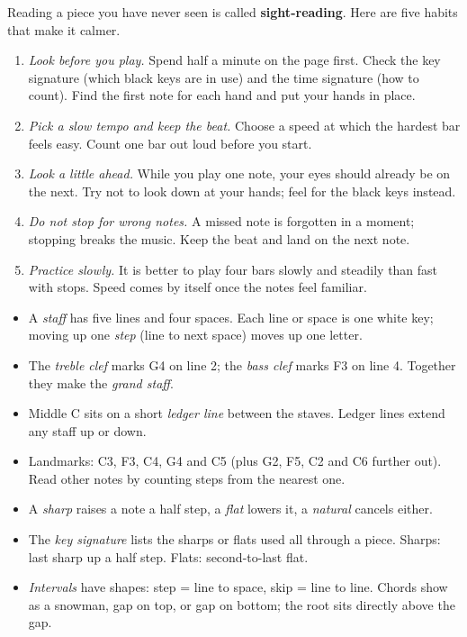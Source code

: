 Reading a piece you have never seen is called \textbf{sight-reading}. Here are five habits that make it calmer.
\begin{enumerate}
  \item \emph{Look before you play.} Spend half a minute on the page first. Check the key signature (which black keys are in use) and the time signature (how to count). Find the first note for each hand and put your hands in place.
  \item \emph{Pick a slow tempo and keep the beat.} Choose a speed at which the hardest bar feels easy. Count one bar out loud before you start.
  \item \emph{Look a little ahead.} While you play one note, your eyes should already be on the next. Try not to look down at your hands; feel for the black keys instead.
  \item \emph{Do not stop for wrong notes.} A missed note is forgotten in a moment; stopping breaks the music. Keep the beat and land on the next note.
  \item \emph{Practice slowly.} It is better to play four bars slowly and steadily than fast with stops. Speed comes by itself once the notes feel familiar.
\end{enumerate}

\begin{summarybox}
\begin{itemize}
  \item A \emph{staff} has five lines and four spaces. Each line or space is one white key; moving up one \emph{step} (line to next space) moves up one letter.
  \item The \emph{treble clef} marks G4 on line 2; the \emph{bass clef} marks F3 on line 4. Together they make the \emph{grand staff}.
  \item Middle C sits on a short \emph{ledger line} between the staves. Ledger lines extend any staff up or down.
  \item Landmarks: C3, F3, C4, G4 and C5 (plus G2, F5, C2 and C6 further out). Read other notes by counting steps from the nearest one.
  \item A \emph{sharp} raises a note a half step, a \emph{flat} lowers it, a \emph{natural} cancels either.
  \item The \emph{key signature} lists the sharps or flats used all through a piece. Sharps: last sharp up a half step. Flats: second-to-last flat.
  \item \emph{Intervals} have shapes: step = line to space, skip = line to line. Chords show as a snowman, gap on top, or gap on bottom; the root sits directly above the gap.
\end{itemize}
\end{summarybox}

